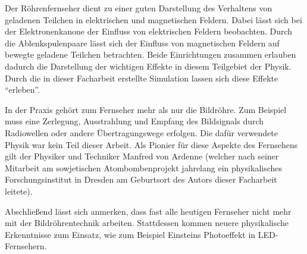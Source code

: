 Der Röhrenfernseher dient zu einer guten Darstellung des Verhaltens von geladenen Teilchen in elektrischen und magnetischen Feldern.
Dabei lässt sich bei der Elektronenkanone der Einfluss von elektrischen Feldern beobachten.  
Durch die Ablenkspulenpaare lässt sich der Einfluss von magnetischen Feldern auf bewegte geladene Teilchen betrachten.
Beide Einrichtungen zusammen erlauben dadurch die Darstellung der wichtigen Effekte in diesem Teilgebiet der Physik.
Durch die in dieser Facharbeit erstellte Simulation lassen sich diese Effekte "`erleben"'.

In der Praxis gehört zum Fernseher mehr als nur die Bildröhre.
Zum Beispiel muss eine Zerlegung, Ausstrahlung und Empfang des Bildsignals durch Radiowellen oder andere Übertragungswege erfolgen.
Die dafür verwendete Physik war kein Teil dieser Arbeit.
Als Pionier für diese Aspekte des Fernsehens gilt der Physiker und Techniker Manfred von Ardenne (welcher nach seiner Mitarbeit am sowjetischen Atombombenprojekt jahrelang ein physikalisches Forschungsinstitut in Dresden am Geburtsort des Autors dieser Facharbeit leitete).

Abschließend lässt sich anmerken, dass fast alle heutigen Fernseher nicht mehr mit der Bildröhrentechnik arbeiten.
Stattdessen kommen neuere physikalische Erkenntnisse zum Einsatz, wie zum Beispiel Einsteins Photoeffekt in LED-Fernsehern.